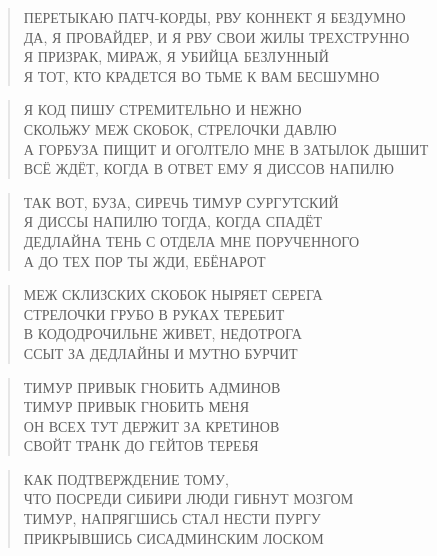 \poemtitle{***}
\begin{verse}
ПЕРЕТЫКАЮ ПАТЧ-КОРДЫ, РВУ КОННЕКТ Я БЕЗДУМНО\\
ДА, Я ПРОВАЙДЕР, И Я РВУ СВОИ ЖИЛЫ ТРЕХСТРУННО\\
Я ПРИЗРАК, МИРАЖ, Я УБИЙЦА БЕЗЛУННЫЙ\\
Я ТОТ, КТО КРАДЕТСЯ ВО ТЬМЕ К ВАМ БЕСШУМНО
\end{verse}

\poemtitle{***}
\begin{verse}
Я КОД ПИШУ СТРЕМИТЕЛЬНО И НЕЖНО\\
СКОЛЬЖУ МЕЖ СКОБОК, СТРЕЛОЧКИ ДАВЛЮ\\
А ГОРБУЗА ПИЩИТ И ОГОЛТЕЛО МНЕ В ЗАТЫЛОК ДЫШИТ\\
ВСЁ ЖДЁТ, КОГДА В ОТВЕТ ЕМУ Я ДИССОВ НАПИЛЮ
\end{verse}

\poemtitle{***}
\begin{verse}
ТАК ВОТ, БУЗА, СИРЕЧЬ ТИМУР СУРГУТСКИЙ\\
Я ДИССЫ НАПИЛЮ ТОГДА, КОГДА СПАДЁТ\\
ДЕДЛАЙНА ТЕНЬ С ОТДЕЛА МНЕ ПОРУЧЕННОГО\\
А ДО ТЕХ ПОР ТЫ ЖДИ, ЕБЁНАРОТ
\end{verse}

\poemtitle{***}
\begin{verse}
МЕЖ СКЛИЗСКИХ СКОБОК НЫРЯЕТ СЕРЕГА\\
СТРЕЛОЧКИ ГРУБО В РУКАХ ТЕРЕБИТ\\
В КОДОДРОЧИЛЬНЕ ЖИВЕТ, НЕДОТРОГА\\
ССЫТ ЗА ДЕДЛАЙНЫ И МУТНО БУРЧИТ
\end{verse}

\poemtitle{***}
\begin{verse}
ТИМУР ПРИВЫК ГНОБИТЬ АДМИНОВ\\
ТИМУР ПРИВЫК ГНОБИТЬ МЕНЯ\\
ОН ВСЕХ ТУТ ДЕРЖИТ ЗА КРЕТИНОВ\\
СВОЙТ ТРАНК ДО ГЕЙТОВ ТЕРЕБЯ
\end{verse}

\poemtitle{***}
\begin{verse}
КАК ПОДТВЕРЖДЕНИЕ ТОМУ,\\
ЧТО ПОСРЕДИ СИБИРИ ЛЮДИ ГИБНУТ МОЗГОМ\\
ТИМУР, НАПРЯГШИСЬ СТАЛ НЕСТИ ПУРГУ\\
ПРИКРЫВШИСЬ СИСАДМИНСКИМ ЛОСКОМ
\end{verse}

